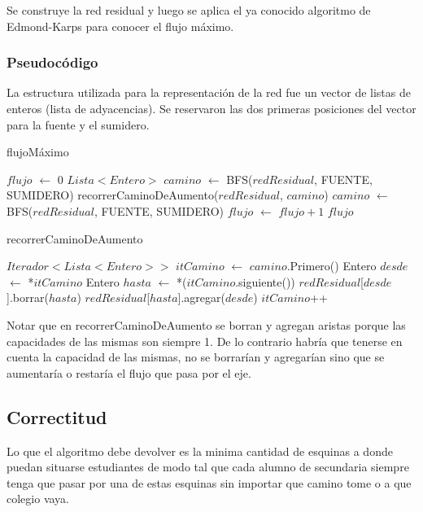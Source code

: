 Se construye la red residual y luego se aplica el ya conocido algoritmo de Edmond-Karps para conocer el flujo máximo.

\subsubsection*{Pseudocódigo}

La estructura utilizada para la representación de la red fue un vector de listas de enteros (lista de adyacencias). Se reservaron las dos primeras posiciones del vector para la fuente y el sumidero.

\begin{algorithm}[]
	\caption{flujoMáximo}

	$flujo$ $\gets$ 0 \;
	$Lista<Entero>$ $camino$ $\gets$ BFS($redResidual$, FUENTE, SUMIDERO) \;
	 {
		recorrerCaminoDeAumento($redResidual$, $camino$) \;
		$camino$ $\gets$ BFS($redResidual$, FUENTE, SUMIDERO) \;
		$flujo$ $\gets$ $flujo + 1$ \;
	}
	\Return $flujo$ \;
\end{algorithm}

\begin{algorithm}[]
	\caption{recorrerCaminoDeAumento}

	$Iterador<Lista<Entero>>$ $itCamino$ $\gets$ $camino$.Primero() \;
	 {
		Entero $desde$ $\gets$ *$itCamino$ \;
		Entero $hasta$ $\gets$ *($itCamino$.siguiente()) \;
		$redResidual$[$desde$].borrar($hasta$) \;
		$redResidual$[$hasta$].agregar($desde$) \;
		$itCamino$++ \;
	}
\end{algorithm}

Notar que en recorrerCaminoDeAumento se borran y agregan aristas porque las capacidades de las mismas son siempre 1. De lo contrario habría que tenerse en cuenta la capacidad de las mismas, no se borrarían y agregarían sino que se aumentaría o restaría el flujo que pasa por el eje.

\subsection{Correctitud}

Lo que el algoritmo debe devolver es la minima cantidad de esquinas a donde puedan situarse estudiantes de modo tal que cada alumno de secundaria siempre tenga que pasar por una de estas esquinas sin importar que camino tome o a que colegio vaya.

